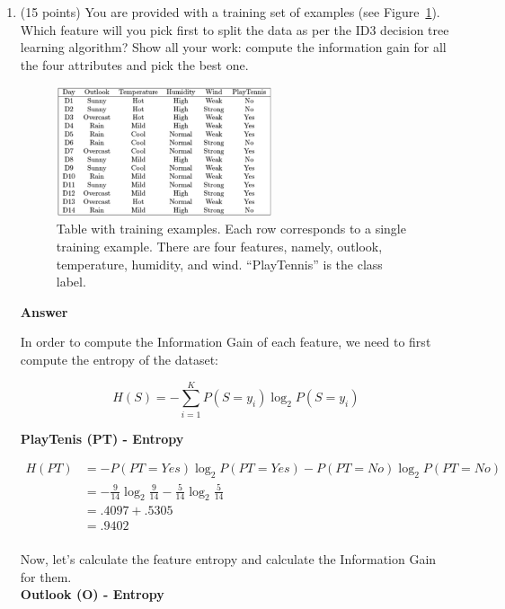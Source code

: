\documentclass[11pt]{article}
\begin{document}
\begin{enumerate}

\item (15 points) You are provided with a training set of
examples (see Figure~\ref{fig:tree}). Which feature will you pick
first to split the data as per the ID3 decision tree learning
algorithm? Show all your work: compute the information gain for
all the four attributes and pick the best one.

\begin{figure}[ht]\label{fig:tree}
\begin{center}
    \includegraphics[width=0.6\textwidth]{tree.jpg}
    \caption{Table with training examples. Each row corresponds
    to a single training example. There are four features,
    namely, outlook, temperature, humidity, and wind.
    ``PlayTennis'' is the class label.}
\end{center}
\end{figure}

\textbf{Answer}

In order to compute the Information Gain of each feature, we need to first compute the entropy of the dataset:

\[
H(S) = - \sum_{i=1}^K P(S=y_i) \log_2 P(S=y_i)
\]

\textbf{PlayTenis (PT) - Entropy}

\[
\begin{aligned}
H(PT)&= -P(PT=Yes) \log_2 P(PT=Yes)-P(PT=No) \log_2 P(PT=No)\\[5pt]
&= -\frac{9}{14}\log_2\frac{9}{14}-\frac{5}{14}\log_2\frac{5}{14}\\[5pt]
&= .4097 + .5305\\[5pt]
&= .9402
\end{aligned}
\]\\

Now, let's calculate the feature entropy and calculate the Information Gain for them.\\

\textbf{Outlook (O) - Entropy}


\end{enumerate}
\end{document}
